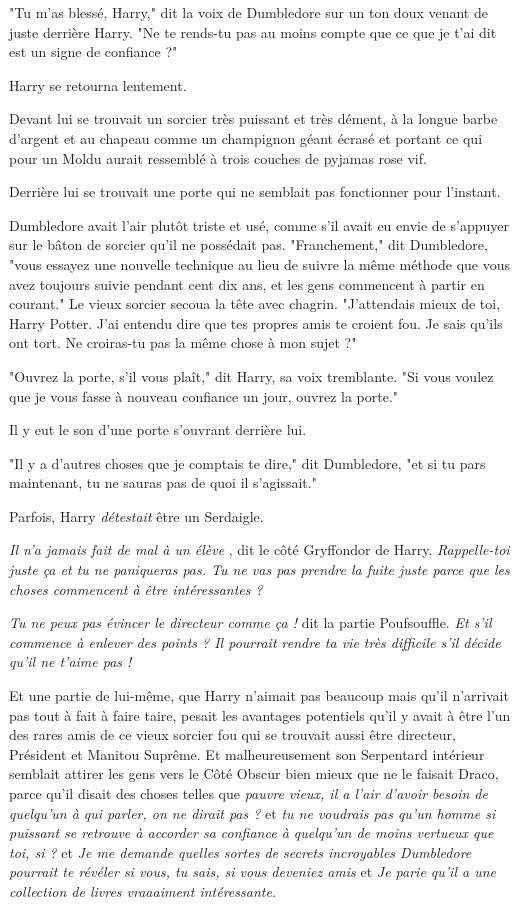 "Tu m'as blessé, Harry," dit la voix de Dumbledore sur un ton doux venant de juste derrière Harry. "Ne te rends-tu pas au moins compte que ce que je t'ai dit est un signe de confiance ?"

Harry se retourna lentement.

Devant lui se trouvait un sorcier très puissant et très dément, à la longue barbe d'argent et au chapeau comme un champignon géant écrasé et portant ce qui pour un Moldu aurait ressemblé à trois couches de pyjamas rose vif.

Derrière lui se trouvait une porte qui ne semblait pas fonctionner pour l'instant.

Dumbledore avait l'air plutôt triste et usé, comme s'il avait eu envie de s'appuyer sur le bâton de sorcier qu'il ne possédait pas. "Franchement," dit Dumbledore, "vous essayez une nouvelle technique au lieu de suivre la même méthode que vous avez toujours suivie pendant cent dix ans, et les gens commencent à partir en courant." Le vieux sorcier secoua la tête avec chagrin. "J'attendais mieux de toi, Harry Potter. J'ai entendu dire que tes propres amis te croient fou. Je sais qu'ils ont tort. Ne croiras-tu pas la même chose à mon sujet ?"

"Ouvrez la porte, s'il vous plaît," dit Harry, sa voix tremblante. "Si vous voulez que je vous fasse à nouveau confiance un jour, ouvrez la porte."

Il y eut le son d'une porte s'ouvrant derrière lui.

"Il y a d'autres choses que je comptais te dire," dit Dumbledore, "et si tu pars maintenant, tu ne sauras pas de quoi il s'agissait."

Parfois, Harry \emph{détestait}  être un Serdaigle.

\emph{Il n'a jamais fait de mal à un élève} , dit le côté Gryffondor de Harry. \emph{Rappelle-toi juste ça et tu ne paniqueras pas. Tu ne vas pas prendre la fuite juste parce que les choses commencent à être intéressantes ?} 

\emph{Tu ne peux pas évincer le directeur comme ça !}  dit la partie Poufsouffle. \emph{Et s'il commence à enlever des points ? Il pourrait rendre ta vie très difficile s'il décide qu'il ne t'aime pas !} 

Et une partie de lui-même, que Harry n'aimait pas beaucoup mais qu'il n'arrivait pas tout à fait à faire taire, pesait les avantages potentiels qu'il y avait à être l'un des rares amis de ce vieux sorcier fou qui se trouvait aussi être directeur, Président et Manitou Suprême. Et malheureusement son Serpentard intérieur semblait attirer les gens vers le Côté Obscur bien mieux que ne le faisait Draco, parce qu'il disait des choses telles que \emph{pauvre vieux, il a l'air d'avoir besoin de quelqu'un à qui parler, on ne dirait pas ? } et \emph{tu ne voudrais pas qu'un homme si puissant se retrouve à accorder sa confiance à quelqu'un de moins vertueux que toi, si ?}  et \emph{Je me demande quelles sortes de secrets incroyables Dumbledore pourrait te révéler si vous, tu sais, si vous deveniez amis } et \emph{Je parie qu'il a une collection de livres vraaaiment intéressante.} 

